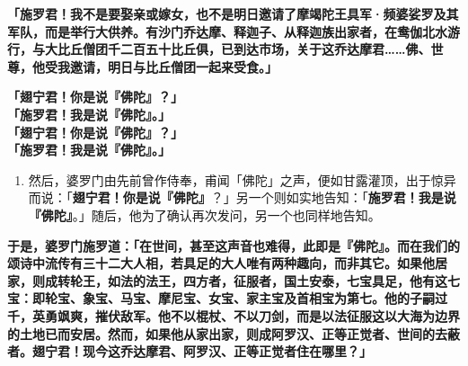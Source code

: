 \textbf{「施罗君！我不是要娶亲或嫁女，也不是明日邀请了摩竭陀王具军·频婆娑罗及其军队，而是举行大供养。有沙门乔达摩、释迦子、从释迦族出家者，在鸯伽北水游行，与大比丘僧团千二百五十比丘俱，已到达市场，关于这乔达摩君……佛、世尊，他受我邀请，明日与比丘僧团一起来受食。」}

\textbf{「翅宁君！你是说『佛陀』？」\\}
\textbf{「施罗君！我是说『佛陀』。」\\}
\textbf{「翅宁君！你是说『佛陀』？」\\}
\textbf{「施罗君！我是说『佛陀』。」}

\begin{enumerate}\item 然后，婆罗门由先前曾作侍奉，甫闻「佛陀」之声，便如甘露灌顶，出于惊异而说：「\textbf{翅宁君！你是说『佛陀』}？」另一个则如实地告知：「\textbf{施罗君！我是说『佛陀』}。」随后，他为了确认再次发问，另一个也同样地告知。\end{enumerate}

\textbf{于是，婆罗门施罗道：「在世间，甚至这声音也难得，此即是『佛陀』。而在我们的颂诗中流传有三十二大人相，若具足的大人唯有两种趣向，而非其它。如果他居家，则成转轮王，如法的法王，四方者，征服者，国土安泰，七宝具足，他有这七宝：即轮宝、象宝、马宝、摩尼宝、女宝、家主宝及首相宝为第七。他的子嗣过千，英勇飒爽，摧伏敌军。他不以棍杖、不以刀剑，而是以法征服这以大海为边界的土地已而安居。然而，如果他从家出家，则成阿罗汉、正等正觉者、世间的去蔽者。翅宁君！现今这乔达摩君、阿罗汉、正等正觉者住在哪里？」}

